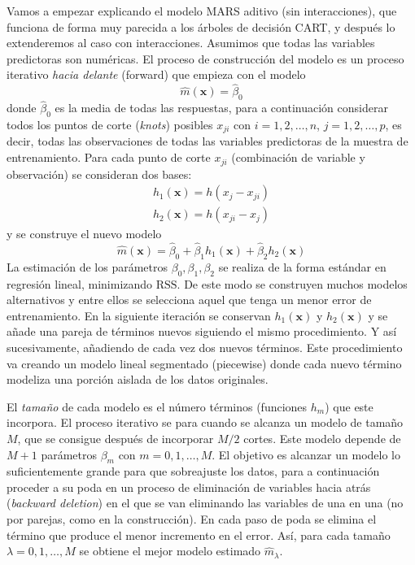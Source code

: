 \documentclass[
  spanish,
]{book}
\theoremstyle{break}
\theoremstyle{definition}
\theoremstyle{definition}
\theoremstyle{definition}
\theoremstyle{definition}
\theoremstyle{remark}
\begin{document}
Vamos a empezar explicando el modelo MARS aditivo (sin interacciones), que funciona de forma muy parecida a los árboles de decisión CART, y después lo extenderemos al caso con interacciones.
Asumimos que todas las variables predictoras son numéricas. El proceso de construcción del modelo es un proceso iterativo \emph{hacia delante} (forward) que empieza con el modelo
\[\hat m(\mathbf{x}) = \hat \beta_0 \]
donde \(\hat \beta_0\) es la media de todas las respuestas, para a continuación considerar todos los puntos de corte (\emph{knots}) posibles \(x_{ji}\) con \(i = 1, 2, \ldots, n\), \(j = 1, 2, \ldots, p\), es decir, todas las observaciones de todas las variables predictoras de la muestra de entrenamiento.
Para cada punto de corte \(x_{ji}\) (combinación de variable y observación) se consideran dos bases:
\[ \begin{aligned}
h_1(\mathbf{x}) = h(x_j - x_{ji}) \\
h_2(\mathbf{x}) = h(x_{ji} - x_j)
\end{aligned}\]
y se construye el nuevo modelo
\[\hat m(\mathbf{x}) = \hat \beta_0 + \hat \beta_1 h_1(\mathbf{x}) + \hat \beta_2 h_2(\mathbf{x})\]
La estimación de los parámetros \(\beta_0, \beta_1, \beta_2\) se realiza de la forma estándar en regresión lineal, minimizando \(\mbox{RSS}\). De este modo se construyen muchos modelos alternativos y entre ellos se selecciona aquel que tenga un menor error de entrenamiento. En la siguiente iteración se conservan \(h_1(\mathbf{x})\) y \(h_2(\mathbf{x})\) y se añade una pareja de términos nuevos siguiendo el mismo procedimiento. Y así sucesivamente, añadiendo de cada vez dos nuevos términos. Este procedimiento va creando un modelo lineal segmentado (piecewise) donde cada nuevo término modeliza una porción aislada de los datos originales.

El \emph{tamaño} de cada modelo es el número términos (funciones \(h_m\)) que este incorpora. El proceso iterativo se para cuando se alcanza un modelo de tamaño \(M\), que se consigue después de incorporar \(M/2\) cortes. Este modelo depende de \(M+1\) parámetros \(\beta_m\) con \(m=0,1,\ldots,M\). El objetivo es alcanzar un modelo lo suficientemente grande para que sobreajuste los datos, para a continuación proceder a su poda en un proceso de eliminación de variables hacia atrás (\emph{backward deletion}) en el que se van eliminando las variables de una en una (no por parejas, como en la construcción). En cada paso de poda se elimina el término que produce el menor incremento en el error. Así, para cada tamaño \(\lambda = 0,1,\ldots, M\) se obtiene el mejor modelo estimado \(\hat{m}_{\lambda}\).
\end{document}

